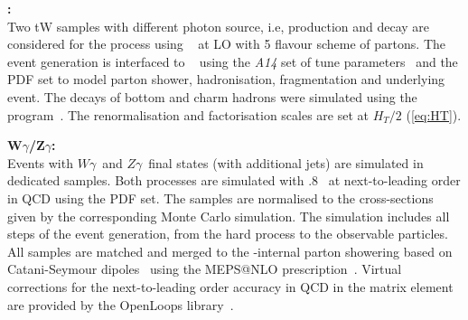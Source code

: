 \textbf{\tWy:}\\
Two tW samples with different photon source, i.e, production and decay are considered for the \tWy process using \MGNLO[2.7.3]~\cite{Alwall:2014hca} at LO with 5 flavour scheme of partons. The event generation is interfaced to \PYTHIA[8.240]~\cite{Sjostrand:2007gs} using the \emph{A14} set of tune parameters~\cite{ATL-PHYS-PUB-2014-021} and the \nnpdflo PDF set to model parton shower, hadronisation, fragmentation and underlying event. The decays of bottom and charm hadrons were simulated using the \EVTGEN[1.6.0] program~\cite{Lange:2001uf}. The renormalisation and factorisation scales are set at $H_{T}/2$ (\cref{eq:HT}). %



\textbf{W$\gamma$/Z$\gamma$:} \\
Events with $W\gamma$~and $Z\gamma$~final states (with additional jets) are simulated in dedicated samples. Both processes are simulated with .8~\cite{Gleisberg:2008ta,Hoeche:2009rj} at next-to-leading order in QCD using the \nnpdfnnlo PDF set. %
The samples are normalised to the cross-sections given by the corresponding Monte Carlo simulation. The simulation includes all steps of the event generation, from the hard process to the observable particles. All samples are matched and merged to the \sherpa-internal parton showering based on Catani-Seymour dipoles~\cite{Gleisberg:2008fv,Schumann:2007mg} using the MEPS@NLO prescription~\cite{Hoeche:2011fd,Catani:2001cc,Hoeche:2012yf}. Virtual corrections for the next-to-leading order accuracy in QCD in the matrix element are provided by the OpenLoops library~\cite{Cascioli:2011va,Denner:2016kdg}.



